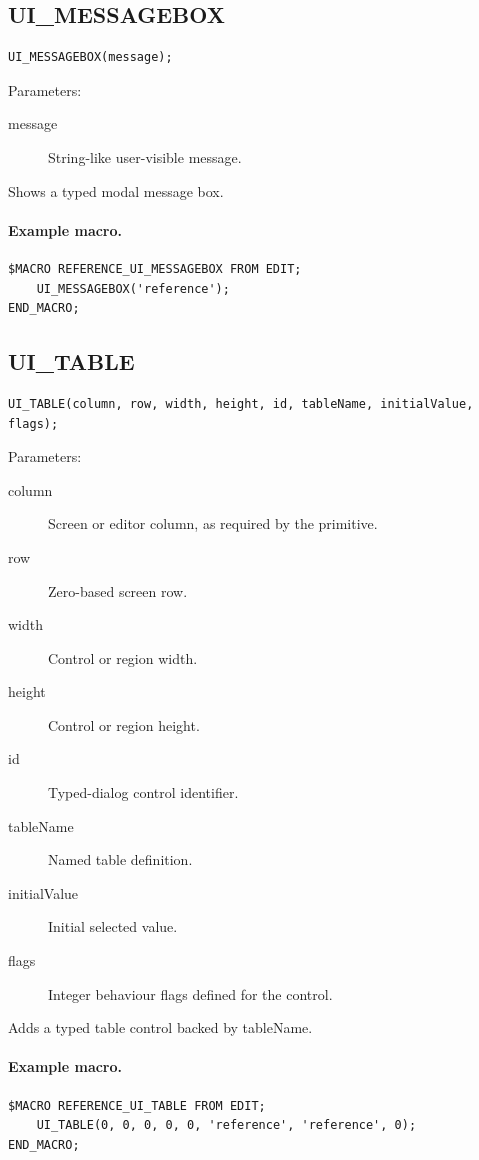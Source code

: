\documentclass[a4paper,10pt,twoside,openany]{book}
\newenvironment{mrmacextension}{\begin{changebar}}{\end{changebar}}
\begin{document}
\begin{mrmacextension}
\label{prim:procedure-ui-messagebox}
\subsection*{UI\_MESSAGEBOX}
\begin{verbatim}
UI_MESSAGEBOX(message);
\end{verbatim}
Parameters:
\begin{description}
\item[message] String-like user-visible message.
\end{description}

Shows a typed modal message box.

\paragraph{Example macro.}
\begin{verbatim}
$MACRO REFERENCE_UI_MESSAGEBOX FROM EDIT;
    UI_MESSAGEBOX('reference');
END_MACRO;
\end{verbatim}
\end{mrmacextension}

\begin{mrmacextension}
\label{prim:procedure-ui-table}
\subsection*{UI\_TABLE}
\begin{verbatim}
UI_TABLE(column, row, width, height, id, tableName, initialValue, flags);
\end{verbatim}
Parameters:
\begin{description}
\item[column] Screen or editor column, as required by the primitive.
\item[row] Zero-based screen row.
\item[width] Control or region width.
\item[height] Control or region height.
\item[id] Typed-dialog control identifier.
\item[tableName] Named table definition.
\item[initialValue] Initial selected value.
\item[flags] Integer behaviour flags defined for the control.
\end{description}

Adds a typed table control backed by tableName.

\paragraph{Example macro.}
\begin{verbatim}
$MACRO REFERENCE_UI_TABLE FROM EDIT;
    UI_TABLE(0, 0, 0, 0, 0, 'reference', 'reference', 0);
END_MACRO;
\end{verbatim}
\end{mrmacextension}
\end{document}

